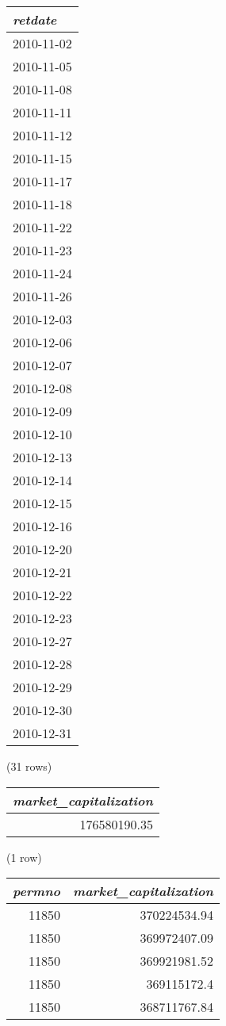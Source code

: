 \begin{tabular}{l}
\textit{retdate} \\
\hline
2010-11-02 \\
2010-11-05 \\
2010-11-08 \\
2010-11-11 \\
2010-11-12 \\
2010-11-15 \\
2010-11-17 \\
2010-11-18 \\
2010-11-22 \\
2010-11-23 \\
2010-11-24 \\
2010-11-26 \\
2010-12-03 \\
2010-12-06 \\
2010-12-07 \\
2010-12-08 \\
2010-12-09 \\
2010-12-10 \\
2010-12-13 \\
2010-12-14 \\
2010-12-15 \\
2010-12-16 \\
2010-12-20 \\
2010-12-21 \\
2010-12-22 \\
2010-12-23 \\
2010-12-27 \\
2010-12-28 \\
2010-12-29 \\
2010-12-30 \\
2010-12-31 \\
\end{tabular}

\noindent (31 rows) \\

\begin{tabular}{r}
\textit{market\_capitalization} \\
\hline
176580190.35 \\
\end{tabular}

\noindent (1 row) \\

\begin{tabular}{r | r}
\textit{permno} & \textit{market\_capitalization} \\
\hline
11850 & 370224534.94 \\
11850 & 369972407.09 \\
11850 & 369921981.52 \\
11850 & 369115172.4 \\
11850 & 368711767.84 \\
\end{tabular}

